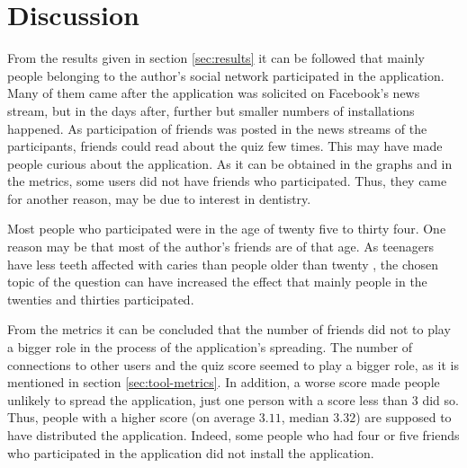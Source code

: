\documentclass[preprint,12pt]{elsarticle}
\begin{document}






\section{Discussion}
\label{sec:discussion}
From the results given in section \ref{sec:results} it can be followed
that mainly people belonging to the author's social network
participated in the application. Many of them came after the
application was solicited on Facebook's news stream, but in the days
after, further but smaller numbers of installations happened. As participation of friends was posted
in the news streams of the participants, friends could read about the
quiz few times. This may have made people curious about the application.
As it can be obtained in the graphs and in the
metrics, some users did not have friends who participated. Thus, they
came for another reason, may be due to interest in dentistry.

Most people who participated were in the age of twenty five to thirty
four. One reason may be that most of the author's friends are of that
age. As teenagers have less teeth affected with
caries than people older than twenty \cite{zahngesundheit}, the chosen
topic of the question can have increased the effect that mainly people
in the twenties and thirties participated.

From the metrics it can be concluded that the number of friends did
not to play a bigger role in the 
process of the application's spreading. The number of connections
to other users and the quiz score seemed to play a bigger 
role, as it is mentioned in section \ref{sec:tool-metrics}. 
In addition, a worse score made people unlikely
to spread the application, just one person with a score less than 3
did so. Thus, people with a higher score (on average $3.11$, median $3.32$) are
supposed to have distributed the application. Indeed, some people who
had four or five friends who participated in the application did not
install the application.
\end{document}
